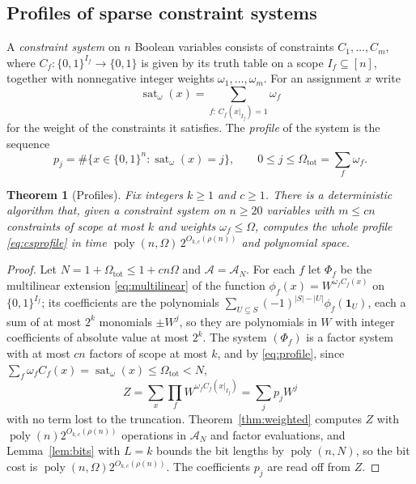 \documentclass[11pt,reqno]{amsart}
\numberwithin{equation}{section}
\theoremstyle{plain}
\newtheorem{theorem}{Theorem}[section]
\theoremstyle{definition}
\theoremstyle{remark}
\DeclareMathOperator{\poly}{poly}
\DeclareMathOperator{\sat}{sat}
\newcommand{\A}{\mathcal{A}}
\newcommand{\rhon}{\rho}
\begin{document}
\subsection{Profiles of sparse constraint systems}\label{ssec:profile}
A \emph{constraint system} on $n$ Boolean variables consists of constraints
$C_1,\dots,C_m$, where $C_f:\{0,1\}^{I_f}\to\{0,1\}$ is given by its truth
table on a scope $I_f\subseteq[n]$, together with nonnegative integer weights
$\omega_1,\dots,\omega_m$. For an assignment $x$ write
\[
  \sat_\omega(x)=\sum_{f:\,C_f(x|_{I_f})=1}\omega_f
\]
for the weight of the constraints it satisfies. The \emph{profile} of the
system is the sequence
\begin{equation}\label{eq:csprofile}
  p_j=\#\{x\in\{0,1\}^n:\sat_\omega(x)=j\},\qquad 0\le j\le\Omega_{\mathrm{tot}}=\sum_f\omega_f .
\end{equation}

\begin{theorem}[Profiles]\label{thm:profile}
Fix integers $k\ge1$ and $c\ge1$. There is a deterministic algorithm that, given
a constraint system on $n\ge20$ variables with $m\le cn$ constraints of scope at
most $k$ and weights $\omega_f\le\Omega$, computes the whole profile
\eqref{eq:csprofile} in time $\poly(n,\Omega)\,2^{O_{k,c}(\rhon(n))}$ and
polynomial space.
\end{theorem}

\begin{proof}
Let $N=1+\Omega_{\mathrm{tot}}\le 1+cn\Omega$ and $\A=\A_N$. For each $f$ let
$\Phi_f$ be the multilinear extension \eqref{eq:multilinear} of the function
$\phi_f(x)=W^{\omega_f C_f(x)}$ on $\{0,1\}^{I_f}$; its coefficients are the
polynomials $\sum_{U\subseteq S}(-1)^{|S|-|U|}\phi_f(\mathbf 1_U)$, each a sum of
at most $2^k$ monomials $\pm W^{j}$, so they are polynomials in $W$ with integer
coefficients of absolute value at most $2^k$. The system $(\Phi_f)$ is a factor
system with at most $cn$ factors of scope at most $k$, and by
\eqref{eq:profile}, since $\sum_f\omega_fC_f(x)=\sat_\omega(x)\le\Omega_{\mathrm{tot}}<N$,
\[
  Z=\sum_{x}\prod_f W^{\omega_fC_f(x|_{I_f})}=\sum_{j}p_jW^{j}
\]
with no term lost to the truncation. Theorem~\ref{thm:weighted} computes $Z$
with $\poly(n)2^{O_{k,c}(\rhon(n))}$ operations in $\A_N$ and factor
evaluations, and Lemma~\ref{lem:bits} with $L=k$ bounds the bit lengths by
$\poly(n,N)$, so the bit cost is $\poly(n,\Omega)2^{O_{k,c}(\rhon(n))}$. The
coefficients $p_j$ are read off from $Z$.
\end{proof}
\end{document}
